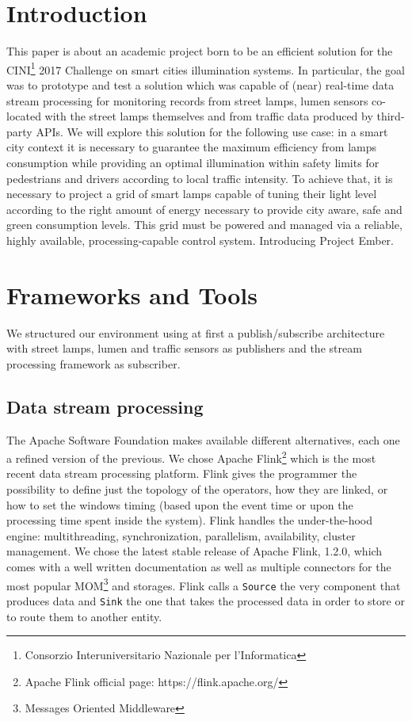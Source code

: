 \section{Introduction}
This paper is about an academic project born to be an efficient solution for the CINI\footnote{Consorzio Interuniversitario Nazionale per l'Informatica} 2017 Challenge on smart cities illumination systems. In particular, the goal was to prototype and test a solution which was capable of (near) real-time data stream processing for monitoring records from street lamps, lumen sensors co-located with the street lamps themselves and from traffic data produced by third-party APIs. We will explore this solution for the following use case: in a smart city context it is necessary to guarantee the maximum efficiency from lamps consumption while providing an optimal illumination within safety limits for pedestrians and drivers according to local traffic intensity. To achieve that, it is necessary to project a grid of smart lamps capable of tuning their light level according to the right amount of energy necessary to provide city aware, safe and green consumption levels. This grid must be powered and managed via a reliable, highly available, processing-capable control system. Introducing Project Ember.

\section{Frameworks and Tools}
We structured our environment using at first a publish/subscribe architecture with street lamps, lumen and traffic sensors as publishers and the stream processing framework as subscriber. 

\subsection{Data stream processing}
The Apache Software Foundation makes available different alternatives, each one a refined version of the previous. We chose Apache Flink\footnote{Apache Flink official page: https://flink.apache.org/} which is the most recent data stream processing platform. Flink gives the programmer the possibility to define just the topology of the operators, how they are linked, or how to set the windows timing (based upon the event time or upon the processing time spent inside the system). Flink handles the under-the-hood engine: multithreading, synchronization, parallelism, availability, cluster management. We chose the latest stable release of Apache Flink, 1.2.0, which comes with a well written documentation as well as multiple connectors for the most popular MOM\footnote{Messages Oriented Middleware} and storages. Flink calls a \texttt{Source} the very component that produces data and \texttt{Sink} the one that takes the processed data in order to store or to route them to another entity.

